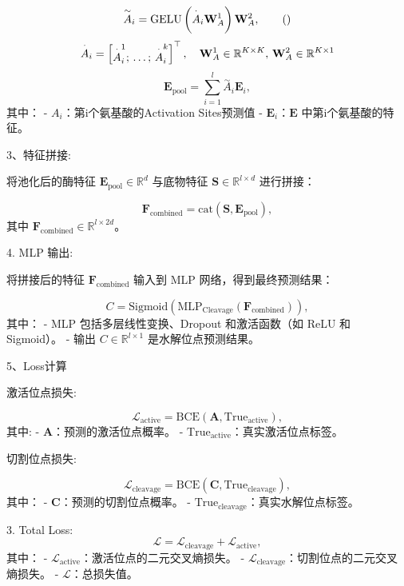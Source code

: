 \[
\\\overset{\sim}A_{i} = \text{GELU} \left( \\\overset{\cdot}{A}_{i} \mathbf{W}_A^1 \right) \mathbf{W}_A^2,\tag{}
\]
\[
\\\overset{\cdot}A_{i} = 
\begin{bmatrix}
\overset{\cdot}A_{i}^1 ; \, \dots ; \, \overset{\cdot}A_{i}^{k}
\end{bmatrix}^\top, \quad
\mathbf{W}_A^1 \in \mathbb{R}^{K \times K}, \, \mathbf{W}_A^2 \in \mathbb{R}^{K \times 1}
\]
\[
\mathbf{E}_{\text{pool}} = \sum_{i=1}^l \overset{\sim}A_i \mathbf{E}_i,\tag{12}
\]
其中：
- \( A_i \)：第i个氨基酸的Activation Sites预测值
- \(\mathbf{E}_i\)：\(\mathbf{E}\) 中第i个氨基酸的特征。

3、特征拼接:

将池化后的酶特征 \(\mathbf{E}_{\text{pool}} \in \mathbb{R}^d\) 与底物特征 \(\mathbf{S} \in \mathbb{R}^{l \times d}\) 进行拼接：

\[
\mathbf{F}_{\text{combined}} = \text{cat}(\mathbf{S}, \mathbf{E}_{\text{pool}}),\tag{13}
\]
其中 \(\mathbf{F}_{\text{combined}} \in \mathbb{R}^{l \times 2d}\)。

4. MLP 输出: 

将拼接后的特征 \(\mathbf{F}_{\text{combined}}\) 输入到 MLP 网络，得到最终预测结果：

\[
C =\text{Sigmoid}( \text{MLP}_{\text{Cleavage}}(\mathbf{F}_{\text{combined}})),\tag{14}
\]
其中：
- MLP 包括多层线性变换、Dropout 和激活函数（如 ReLU 和 Sigmoid）。
- 输出 \(C \in \mathbb{R}^{l\times 1}\) 是水解位点预测结果。

5、Loss计算

激活位点损失:

\[
\mathcal{L}_{\text{active}} = \text{BCE}(\mathbf{A}, \text{True}_{\text{active}}),\tag{15}
\]
其中:
- \(\mathbf{A}\)：预测的激活位点概率。
- \(\text{True}_{\text{active}}\)：真实激活位点标签。

切割位点损失:

\[
\mathcal{L}_{\text{cleavage}} = \text{BCE}(\mathbf{C}, \text{True}_{\text{cleavage}}),\tag{16}
\]
其中：
- \(\mathbf{C}\)：预测的切割位点概率。
- \(\text{True}_{\text{cleavage}}\)：真实水解位点标签。

3. Total Loss:
\[
\mathcal{L} = \mathcal{L}_{\text{cleavage}} + \mathcal{L}_{\text{active}},\tag{17}
\]
其中：
- \(\mathcal{L}_{\text{active}}\)：激活位点的二元交叉熵损失。
- \(\mathcal{L}_{\text{cleavage}}\)：切割位点的二元交叉熵损失。
- \(\mathcal{L}\)：总损失值。

